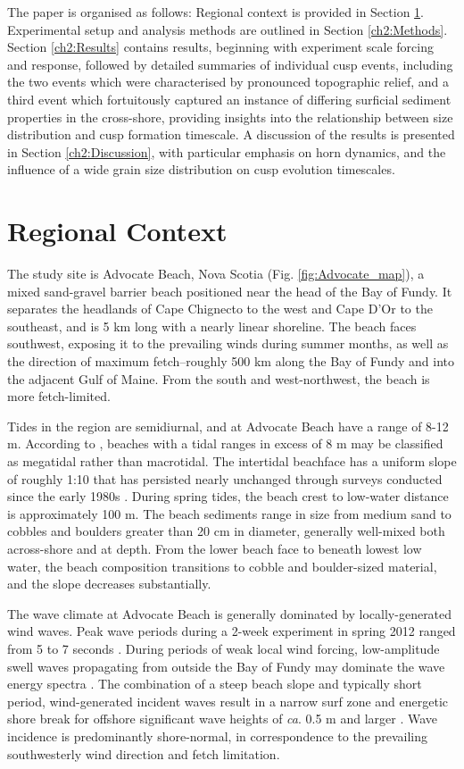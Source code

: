 The paper is organised as follows: Regional context is provided in Section \ref{section:Context}. Experimental setup and analysis methods are outlined in Section \ref{ch2:Methods}. Section \ref{ch2:Results} contains results, beginning with experiment scale forcing and response, followed by detailed summaries of individual cusp events, including the two events which were characterised by pronounced topographic relief, and a third event which fortuitously captured an instance of differing surficial sediment properties in the cross-shore, providing insights into the relationship between size distribution and cusp formation timescale. A discussion of the results is presented in Section \ref{ch2:Discussion}, with particular emphasis on horn dynamics, and the influence of a wide grain size distribution on cusp evolution timescales. 


\section{Regional Context}\label{section:Context}

The study site is Advocate Beach, Nova Scotia (Fig. \ref{fig:Advocate_map}), a mixed sand-gravel barrier beach positioned near the head of the Bay of Fundy. It separates the headlands of Cape Chignecto to the west and Cape D'Or to the southeast, and is 5 km long with a nearly linear shoreline. The beach faces southwest, exposing it to the prevailing winds during summer months, as well as the direction of maximum fetch--roughly 500 km along the Bay of Fundy and into the adjacent Gulf of Maine. From the south and west-northwest, the beach is more fetch-limited.

Tides in the region are semidiurnal, and at Advocate Beach have a range of 8-12 m. According to \citet{Levoy_etal2000}, beaches with a tidal ranges in excess of 8 m may be classified as megatidal rather than macrotidal. The intertidal beachface has a uniform slope of roughly 1:10 that has persisted nearly unchanged through surveys conducted since the early 1980s \citep{Hay_etal2014}. During spring tides, the beach crest to low-water distance is approximately 100 m. The beach sediments range in size from medium sand to cobbles and boulders greater than 20 cm in diameter, generally well-mixed both across-shore and at depth. From the lower beach face to beneath lowest low water, the beach composition transitions to cobble and boulder-sized material, and the slope decreases substantially.

The wave climate at Advocate Beach is generally dominated by locally-generated wind waves. Peak wave periods during a 2-week experiment in spring 2012 ranged from 5 to 7 seconds \citep{Hay_etal2014}. During periods of weak local wind forcing, low-amplitude swell waves propagating from outside the Bay of Fundy may dominate the wave energy spectra \citep[e.g.,][]{Guest_Hay2017}. The combination of a steep beach slope and typically short period, wind-generated incident waves result in a narrow surf zone and energetic shore break for offshore significant wave heights of \textit{ca}. 0.5 m and larger \citep{Hay_etal2014}. Wave incidence is predominantly shore-normal, in correspondence to the prevailing southwesterly wind direction and fetch limitation.

